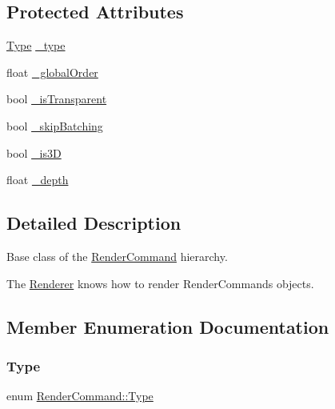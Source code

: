 \subsection*{Protected Attributes}
\begin{DoxyCompactItemize}
\item 
\hyperlink{classRenderCommand_a17af6f8ac8e8a22a9007287a70ae5d1e}{Type} \hyperlink{classRenderCommand_ac1112fb1b5d70f9c08d2625d501377de}{\+\_\+type}
\item 
float \hyperlink{classRenderCommand_a723915024b05d143360931926b25f1f7}{\+\_\+global\+Order}
\item 
bool \hyperlink{classRenderCommand_adff7217f778be8e290b72b43709ae999}{\+\_\+is\+Transparent}
\item 
bool \hyperlink{classRenderCommand_a9b726a6dd50cf99cc70474f0033bf592}{\+\_\+skip\+Batching}
\item 
bool \hyperlink{classRenderCommand_a90ea4cfb1643151cf15420c87f93aac2}{\+\_\+is3D}
\item 
float \hyperlink{classRenderCommand_a8a92addb95261a5fd4bf3697313405d3}{\+\_\+depth}
\end{DoxyCompactItemize}


\subsection{Detailed Description}
Base class of the {\ttfamily \hyperlink{classRenderCommand}{Render\+Command}} hierarchy.

The {\ttfamily \hyperlink{classRenderer}{Renderer}} knows how to render {\ttfamily Render\+Commands} objects. 

\subsection{Member Enumeration Documentation}
\mbox{\label{classRenderCommand_a17af6f8ac8e8a22a9007287a70ae5d1e}} 
\subsubsection{\texorpdfstring{Type}{Type}\hspace{0.1cm}{\footnotesize\ttfamily [1/2]}}
{\footnotesize\ttfamily enum \hyperlink{classRenderCommand_a17af6f8ac8e8a22a9007287a70ae5d1e}{Render\+Command\+::\+Type}\hspace{0.3cm}{\ttfamily [strong]}}

